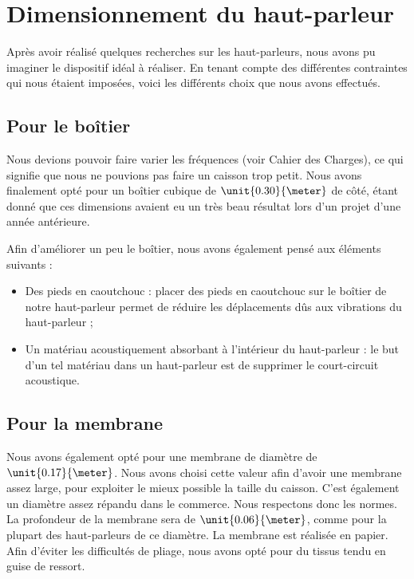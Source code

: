

\section{Dimensionnement du haut-parleur}
Après avoir réalisé quelques recherches sur les haut-parleurs, nous avons pu imaginer le dispositif idéal à réaliser. En tenant compte des différentes contraintes qui nous étaient imposées, voici les différents choix que nous avons effectués.

\subsection{Pour le boîtier}
Nous devions pouvoir faire varier les fréquences (voir Cahier des Charges), ce qui signifie que nous ne pouvions pas faire un caisson trop petit. Nous avons finalement opté pour un
boîtier cubique de $\unit{0.30}{\meter}$ de côté, étant donné que ces dimensions avaient eu un très beau résultat lors d'un projet d'une année antérieure.

Afin d'améliorer un peu le boîtier, nous avons également pensé aux éléments suivants :

\begin{itemize}
	\item	Des pieds en caoutchouc : placer des pieds en caoutchouc sur le boîtier de notre haut-parleur
				permet de réduire les déplacements dûs aux vibrations du haut-parleur ;
	\item	Un matériau acoustiquement absorbant à l'intérieur du haut-parleur : le but d'un tel matériau
				dans un haut-parleur est de supprimer le court-circuit acoustique.
\end{itemize}

\subsection{Pour la membrane}
Nous avons également opté pour une membrane de diamètre de $\unit{0.17}{\meter}$. Nous avons choisi cette valeur afin d'avoir une membrane assez large, pour exploiter le mieux possible la taille du caisson. C'est également un diamètre assez répandu dans le commerce. Nous respectons donc les normes.
La profondeur de la membrane sera de $\unit{0.06}{\meter}$, comme pour la plupart des haut-parleurs de ce diamètre. La membrane est réalisée en papier. Afin d'éviter les difficultés de pliage, nous avons opté pour du tissus tendu en guise de ressort. 

